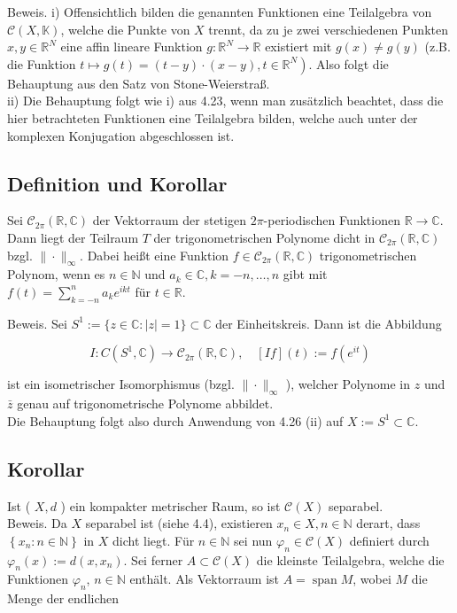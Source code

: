 \documentclass[10pt, letterpaper]{article}
\begin{document}
Beweis. i) Offensichtlich bilden die genannten Funktionen eine Teilalgebra von $\mathcal{C}(X, \mathbb{K})$, welche die Punkte von $X$ trennt, da zu je zwei verschiedenen Punkten $x, y \in \mathbb{R}^{N}$ eine affin lineare Funktion $g: \mathbb{R}^{N} \rightarrow \mathbb{R}$ existiert mit $g(x) \neq g(y)$ (z.B. die Funktion $\left.t \mapsto g(t)=(t-y) \cdot(x-y), t \in \mathbb{R}^{N}\right)$. Also folgt die Behauptung aus den Satz von Stone-Weierstraß.\\
ii) Die Behauptung folgt wie i) aus 4.23, wenn man zusätzlich beachtet, dass die hier betrachteten Funktionen eine Teilalgebra bilden, welche auch unter der komplexen Konjugation abgeschlossen ist.

\subsection*{Definition und Korollar}
Sei $\mathcal{C}_{2 \pi}(\mathbb{R}, \mathbb{C})$ der Vektorraum der stetigen $2 \pi$-periodischen Funktionen $\mathbb{R} \rightarrow \mathbb{C}$. Dann liegt der Teilraum $T$ der trigonometrischen Polynome dicht in $\mathcal{C}_{2 \pi}(\mathbb{R}, \mathbb{C})$ bzgl. $\|\cdot\|_{\infty}$. Dabei heißt eine Funktion $f \in \mathcal{C}_{2 \pi}(\mathbb{R}, \mathbb{C})$ trigonometrischen Polynom, wenn es $n \in \mathbb{N}$ und $a_{k} \in \mathbb{C}, k=-n, \ldots, n$ gibt mit $f(t)=\sum_{k=-n}^{n} a_{k} e^{i k t}$ für $t \in \mathbb{R}$.

Beweis. Sei $S^{1}:=\{z \in \mathbb{C}:|z|=1\} \subset \mathbb{C}$ der Einheitskreis. Dann ist die Abbildung

$$
I: C\left(S^{1}, \mathbb{C}\right) \rightarrow \mathcal{C}_{2 \pi}(\mathbb{R}, \mathbb{C}), \quad[I f](t):=f\left(e^{i t}\right)
$$

ist ein isometrischer Isomorphismus (bzgl. $\|\cdot\|_{\infty}$ ), welcher Polynome in $z$ und $\bar{z}$ genau auf trigonometrische Polynome abbildet.\\
Die Behauptung folgt also durch Anwendung von 4.26 (ii) auf $X:=S^{1} \subset \mathbb{C}$.

\subsection*{Korollar}
Ist ( $X, d$ ) ein kompakter metrischer Raum, so ist $\mathcal{C}(X)$ separabel.\\
Beweis. Da $X$ separabel ist (siehe 4.4), existieren $x_{n} \in X, n \in \mathbb{N}$ derart, dass $\left\{x_{n}: n \in \mathbb{N}\right\}$ in $X$ dicht liegt. Für $n \in \mathbb{N}$ sei nun $\varphi_{n} \in \mathcal{C}(X)$ definiert durch $\varphi_{n}(x):= d\left(x, x_{n}\right)$. Sei ferner $A \subset \mathcal{C}(X)$ die kleinste Teilalgebra, welche die Funktionen $\varphi_{n}$, $n \in \mathbb{N}$ enthält. Als Vektorraum ist $A=\operatorname{span} M$, wobei $M$ die Menge der endlichen
\end{document}
